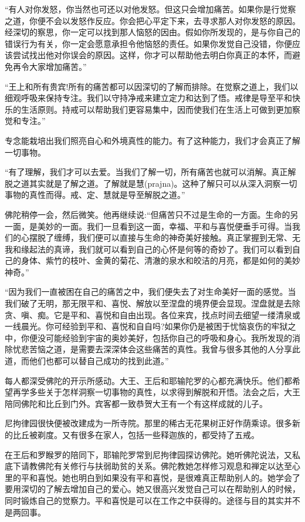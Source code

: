 \documentclass[12pt,twoside,openany]{book}
\begin{document}
“有人对你发怒，你当然也可还以对他发怒。但这只会增加痛苦。如果你是行觉察之道，你便不会以发怒作反应。你会把心平定下来，去寻求那人对你发怒的原因。经深切的察思，你一定可以找到那人恼怒的因由。假如你所发现的，是与你自己的错误行为有关，你一定会愿意承担令他恼怒的责任。如果你发觉自己没错，你便应该尝试找出他对你误会的原因。这样，你才可以帮助他去明白你真正的本怀，而避免再令大家增加痛苦。”

“王上和所有贵宾!所有的痛苦都可以因深切的了解而排除。在觉察之道上，我们以细观呼吸来保持专注。我们以守持净戒来建立定力和达到了悟。戒律是导至平和快乐的生活原则。持戒可以帮助我们更容易集中，因而使我们在生活上可做到更加察觉和专注。”

专念能栽培出我们照亮自心和外境真性的能力。有了这种能力，我们才会真正了解一切事物。

“有了理解，我们才可以去爱。当我们了解一切，所有痛苦也就可以消解。真正解脱之道其实就是了解之道。了解就是慧(prajna)。这种了解只可以从深入洞察一切事物的真性而得。戒、定、慧就是导至解脱之道。”

佛陀稍停一会，然后微笑。他再继续说:“但痛苦只不过是生命的一方面。生命的另一面，是美妙的一面。我们一旦看到这一面，幸福、平和与喜悦便垂手可得。当我们的心摆脱了缠缚，我们便可以直接与生命的神奇美好接触。真正掌握到无常、无我和缘起法的真谛，我们就可以看到自己的心怀是何等的奇妙了。我们可以看到自己的身体、紫竹的枝叶、金黄的菊花、清澈的泉水和皎洁的月亮，都是如何的美妙神奇。”

“因为我们一直被困在自己的痛苦之中，我们便失去了对生命美好一面的感觉。当我们破了无明，那无限平和、喜悦、解放以至涅盘的境界便会显现。涅盘就是去除贪、嗔、痴。它是平和、喜悦和自由出现。各位来宾，找点时间去细望一缕清泉或一线晨光。你可经验到平和、喜悦和自自吗?如果你仍是被困于忧恼哀伤的牢狱之中，你便没可能经验到宇宙的奥妙美好，包括你自己的呼吸和身心。我所发现的消除忧悲苦恼之道，是需要去深深体会这些痛苦的真性。我曾与很多其他的人分享此道，而他们也都可以替自己成功的找到此道。”

每人都深受佛陀的开示所感动。大王、王后和耶输陀罗的心都充满快乐。他们都希望再学多些关于怎样洞察一切事物的真性，以求得到解脱和开悟。法会之后，大王陪同佛陀和比丘到门外。宾客都一致恭贺大王有一个有这样成就的儿子。

尼拘律园很快便被改建成为一所寺院。那里的稀古无花果树正好作荫乘谅。很多新的比丘被剃度。又有很多在家人，包括一些释迦族的，都受持了五戒。

在王后和罗睺罗的陪同下，耶输陀罗常到尼拘律园探访佛陀。她听佛陀说法，又私底下请教佛陀有关修行与扶弱助贫的关系。佛陀教她怎样修习观息和禅定以达至心里的平和喜悦。她也明白到如果没有平和喜悦，是很难真正帮助别人的。她学会了要用深切的了解去增加自己的爱心。她又很高兴发觉自己可以在帮助别人的时候，同时锻炼自己的觉察力。平和喜悦是可以在工作之中获得的。途径与目的其实并不是两回事。
\end{document}
